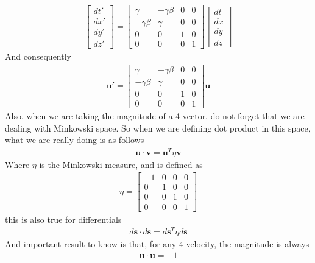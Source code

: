 \documentclass[11pt,letterpaper]{book}
\begin{document}
\begin{align}
\begin{bmatrix}
dt' \\
dx' \\
dy' \\
dz'
\end{bmatrix}
=
\begin{bmatrix}
\gamma & -\gamma\beta & 0 & 0 \\
-\gamma\beta & \gamma & 0 & 0 \\
0 & 0 & 1 & 0 \\
0 & 0 & 0 & 1
\end{bmatrix}
\begin{bmatrix}
dt \\
dx \\
dy \\
dz
\end{bmatrix}
\end{align}
And consequently
\begin{align}
\mathbf{u}' = \begin{bmatrix}
\gamma & -\gamma\beta & 0 & 0 \\
-\gamma\beta & \gamma & 0 & 0 \\
0 & 0 & 1 & 0 \\
0 & 0 & 0 & 1
\end{bmatrix}\mathbf{u}
\end{align}
Also, when we are taking the magnitude of a 4 vector, do not forget that we are dealing with Minkowski space. So when we are defining dot product in this space, what we are really doing is as follows
\begin{align}
\mathbf{u}\cdot \mathbf{v} = \mathbf{u}^T\eta\mathbf{v}
\end{align}
Where $\eta$ is the Minkowski measure, and is defined as
\begin{align}
\eta = \begin{bmatrix}
    -1&0&0&0\\
    0&1&0&0\\
    0&0&1&0\\
    0&0&0&1
\end{bmatrix}
\end{align}
this is also true for differentials
\begin{align}
d\mathbf{s}\cdot d\mathbf{s} = d\mathbf{s}^T\eta d\mathbf{s}
\end{align}
And important result to know is that, for any 4 velocity, the magnitude is always
\begin{align}
\mathbf{u}\cdot \mathbf{u} = -1
\end{align}
\end{document}

